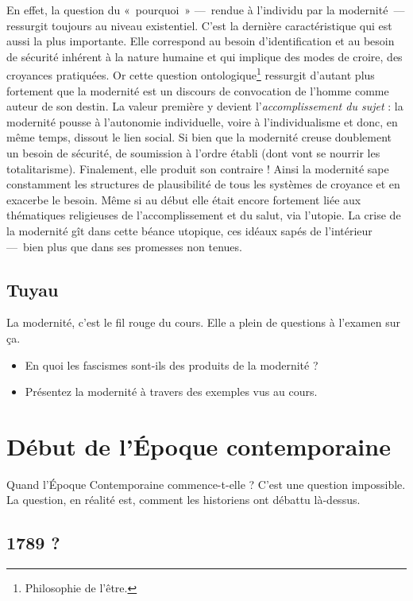 \documentclass[12pt]{report}
\begin{document}
En effet, la question du «~pourquoi~» ---~rendue à l’individu par la modernité~--- ressurgit toujours au niveau existentiel. C'est la dernière caractéristique qui est aussi la plus importante. Elle correspond au besoin d’identification et au besoin de sécurité inhérent à la nature humaine et qui implique des modes de croire, des croyances pratiquées. Or cette question ontologique\footnote{Philosophie de l'être.} ressurgit d’autant plus fortement que la modernité est un discours de convocation de l’homme comme auteur de son destin. La valeur première y devient l’\emph{accomplissement du sujet} : la modernité pousse à l’autonomie individuelle, voire à l’individualisme et donc, en même temps, dissout le lien social. Si bien que la modernité creuse doublement un besoin de sécurité, de soumission à l'ordre établi (dont vont se nourrir les totalitarisme). Finalement, elle produit son contraire !
Ainsi la modernité sape constamment les structures de plausibilité de tous les systèmes de croyance et en exacerbe le besoin. Même si au début elle était encore fortement liée aux thématiques religieuses de l’accomplissement et du salut, via l’utopie. La crise de la modernité gît dans cette béance utopique, ces idéaux sapés de l’intérieur ---~bien plus que dans ses promesses non tenues.

\subsection*{Tuyau}

La modernité, c'est le fil rouge du cours. Elle a plein de questions à l'examen sur ça.

\begin{itemize}
	\item En quoi les fascismes sont-ils des produits de la modernité ?
	\item Présentez la modernité à travers des exemples vus au cours.
\end{itemize}

\section*{Début de l'Époque contemporaine}

Quand l'Époque Contemporaine commence-t-elle ? C'est une question impossible. La question, en réalité est, comment les historiens ont débattu là-dessus.

\subsection*{1789 ?}
\end{document}
